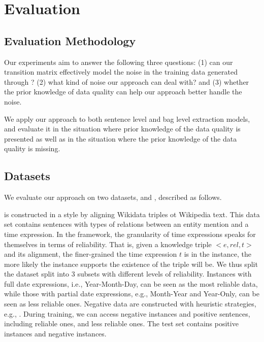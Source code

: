 \section{Evaluation}

\subsection{Evaluation Methodology}
Our experiments aim to answer the following three questions: (1) can our
transition matrix effectively model the noise in the training data generated
through \DS? (2) what kind of noise our approach can deal with? and (3)
whether the prior knowledge of data quality can help our approach better
handle the noise. 

We apply our approach to both sentence level and bag level
extraction models, and evaluate it in the situation where prior knowledge of
the data quality is presented as well as in the situation where the prior
knowledge of the data quality is missing.


\subsection{Datasets}
We evaluate our approach on two datasets, \TimeRE and \EntityRE, described as follows. 

\TimeRE is constructed in a \DS style by aligning Wikidata triples ot
Wikipedia text. This data set contains  sentences with 
types of relations  between an entity mention and a time expression.  In the
\DS framework,   the granularity of time expressions speaks for themselves in
terms of reliability. That is, given a knowledge triple $<e, rel, t>$ and its
alignment,  the  finer-grained the time expression $t$ is in the instance,
the more likely the instance  supports the existence of the triple will be.
   We thus split the dataset  split into
3 subsets with different levels of reliability.  Instances with full date expressions, i.e.,
Year-Month-Day, can be seen as the most reliable data, while those with
partial date expressions, e.g., Month-Year and Year-Only, can be seen as less
reliable ones.  Negative data are constructed with heuristic strategies,
e.g.,  . During training, we can access   negative
instances and   positive sentences, including  reliable
ones,  and  less reliable ones. The test set contains
 positive instances and  negative instances.

